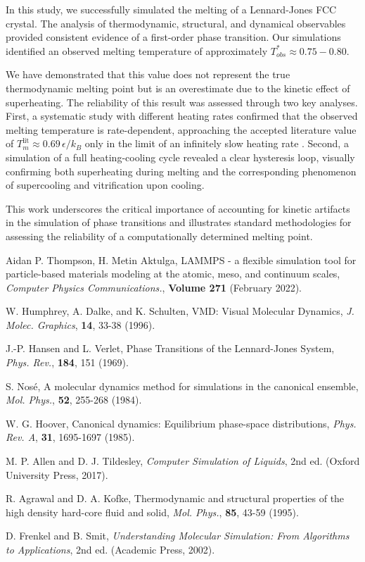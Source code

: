 \documentclass{article}
\begin{document}
In this study, we successfully simulated the melting of a Lennard-Jones FCC crystal. The analysis of thermodynamic, structural, and dynamical observables provided consistent evidence of a first-order phase transition. Our simulations identified an observed melting temperature of approximately $T_{obs}^* \approx 0.75 - 0.80$.

We have demonstrated that this value does not represent the true thermodynamic melting point but is an overestimate due to the kinetic effect of superheating. The reliability of this result was assessed through two key analyses. First, a systematic study with different heating rates confirmed that the observed melting temperature is rate-dependent, approaching the accepted literature value of $T_m^{\text{lit}} \approx 0.69\,\epsilon/k_B$ only in the limit of an infinitely slow heating rate \cite{HansenVerlet, AgrawalKofke}. Second, a simulation of a full heating-cooling cycle revealed a clear hysteresis loop, visually confirming both superheating during melting and the corresponding phenomenon of supercooling and vitrification upon cooling.

This work underscores the critical importance of accounting for kinetic artifacts in the simulation of phase transitions and illustrates standard methodologies for assessing the reliability of a computationally determined melting point.



\begin{thebibliography}{9}


Aidan P. Thompson, H. Metin Aktulga, LAMMPS - a flexible simulation tool for particle-based materials modeling at the atomic, meso, and continuum scales, \textit{Computer Physics Communications.}, \textbf{Volume 271} (February 2022).

W. Humphrey, A. Dalke, and K. Schulten, VMD: Visual Molecular Dynamics, \textit{J. Molec. Graphics}, \textbf{14}, 33-38 (1996).

J.-P. Hansen and L. Verlet, Phase Transitions of the Lennard-Jones System, \textit{Phys. Rev.}, \textbf{184}, 151 (1969).

S. Nosé, A molecular dynamics method for simulations in the canonical ensemble, \textit{Mol. Phys.}, \textbf{52}, 255-268 (1984).

W. G. Hoover, Canonical dynamics: Equilibrium phase-space distributions, \textit{Phys. Rev. A}, \textbf{31}, 1695-1697 (1985).

M. P. Allen and D. J. Tildesley, \textit{Computer Simulation of Liquids}, 2nd ed. (Oxford University Press, 2017).

R. Agrawal and D. A. Kofke, Thermodynamic and structural properties of the high density hard-core fluid and solid, \textit{Mol. Phys.}, \textbf{85}, 43-59 (1995).


D. Frenkel and B. Smit, \textit{Understanding Molecular Simulation: From Algorithms to Applications}, 2nd ed. (Academic Press, 2002).

\end{thebibliography}
\end{document}
